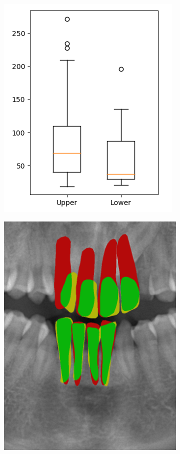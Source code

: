 \documentclass[a4paper,titlepage,12pt]{article}
\begin{document}
\begin{figure}
	\centering
	\begin{subfigure}{0.32\linewidth}
		\centering
		\includegraphics[width=\columnwidth]{results/chart_euclud}
		\caption{}
	\end{subfigure}
	\begin{subfigure}{0.65\linewidth}
		\centering
		\includegraphics[width=0.45\columnwidth]{results/8i10}

\end{subfigure}
\end{figure}
\end{document}
